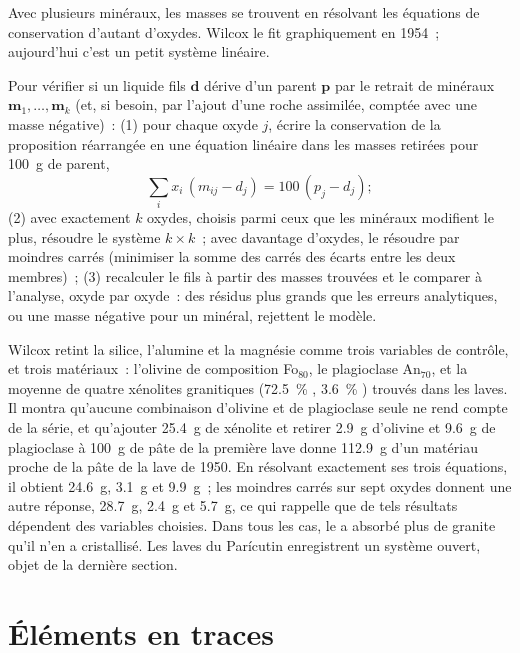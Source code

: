 Avec plusieurs minéraux, les masses se trouvent en résolvant les équations de conservation d'autant
d'oxydes. Wilcox le fit graphiquement en 1954~; aujourd'hui c'est un petit système
linéaire.

\begin{method}\label{met:b2:magmatic-differentiation:massbalance}
Pour vérifier si un liquide fils $\mathbf d$ dérive d'un parent $\mathbf p$ par le retrait de
minéraux $\mathbf m_1, \dots, \mathbf m_k$ (et, si besoin, par l'ajout d'une roche assimilée, comptée avec une masse négative)~: (1) pour chaque oxyde $j$, écrire
la conservation de la proposition réarrangée en
une équation linéaire dans les masses
retirées pour \qty{100}{g} de parent,
\[
\sum_i x_i\,(m_{ij} - d_j) = 100\,(p_j - d_j);
\]
(2) avec exactement $k$ oxydes, choisis parmi ceux que les minéraux modifient le plus, résoudre le
système $k \times k$~; avec davantage d'oxydes, le résoudre par moindres carrés (minimiser la somme des
carrés des écarts entre les deux membres)~; (3) recalculer le fils à partir des masses trouvées et le
comparer à l'analyse, oxyde par oxyde~: des résidus plus grands que les erreurs analytiques, ou une masse
négative pour un minéral, rejettent le modèle.
\end{method}

Wilcox retint la silice, l'alumine et la magnésie comme trois variables de contrôle, et trois
matériaux~: l'olivine de composition Fo$_{80}$, le plagioclase An$_{70}$, et la moyenne de
quatre xénolites granitiques (\qty{72.5}{\percent} , \qty{3.6}{\percent}
) trouvés dans les laves. Il montra qu'aucune combinaison d'olivine et de
plagioclase seule ne rend compte de la série, et qu'ajouter \qty{25.4}{g} de xénolite
et retirer \qty{2.9}{g} d'olivine et \qty{9.6}{g} de plagioclase à
\qty{100}{g} de pâte de la première lave donne \qty{112.9}{g} d'un matériau
proche de la pâte de la lave de 1950. En résolvant exactement ses trois équations,
il obtient \qty{24.6}{g}, \qty{3.1}{g} et \qty{9.9}{g}~; les moindres carrés sur sept oxydes donnent une autre
réponse, \qty{28.7}{g}, \qty{2.4}{g} et \qty{5.7}{g}, ce qui rappelle que de tels résultats dépendent des
variables choisies. Dans tous les cas, le  a absorbé plus de granite
qu'il n'en a cristallisé.
Les laves du Parícutin enregistrent un système ouvert, objet de la dernière section.

\section{Éléments en traces}\label{sec:b2:magmatic-differentiation:trace}

